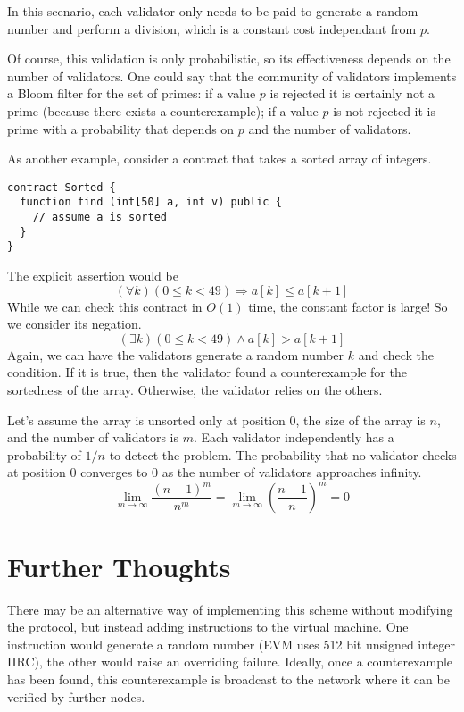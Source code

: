 \documentclass{article}
\begin{document}
In this scenario, each validator only needs to be paid to generate a random number and
perform a division, which is a constant cost independant from $p$.

Of course, this validation is only probabilistic, so its effectiveness depends on the
number of validators. One could say that the community of validators implements a Bloom
filter for the set of primes: if a value $p$ is rejected it is certainly not a prime (because
there exists a counterexample); if a value $p$ is not rejected it is prime with a
probability that depends on $p$ and the number of validators. 

As another example, consider a contract that takes a sorted array of integers.
\begin{lstlisting}[numbers=none]
contract Sorted {
  function find (int[50] a, int v) public {
    // assume a is sorted
  }
}
\end{lstlisting}
The explicit assertion would be
\begin{displaymath}
  (\forall k) (0\le k <49) \Rightarrow a[k] \le a[k+1]
\end{displaymath}
While we can check this contract in $O(1)$ time, the constant factor is large! So we
consider its negation.
\begin{displaymath}
  (\exists k) (0\le k <49) \wedge a[k] > a[k+1]
\end{displaymath}
Again, we can have the validators generate a random number $k$ and check the
condition. If it is true, then the validator found a counterexample for the sortedness
of the array. Otherwise, the validator relies on the others.

Let's assume the array is unsorted only at position $0$, the size of the array is $n$,
and the number of validators is $m$. Each validator independently has a probability of
$1/n$ to detect the problem. The probability that no validator checks at
position $0$ converges to $0$ as the number of validators approaches infinity.
\begin{displaymath}
  \lim_{m\to\infty}\frac{(n-1)^m}{n^m}
  = \lim_{m\to\infty} \left(\frac{n-1}{n}\right)^m
  = 0
\end{displaymath}

\section{Further Thoughts}
\label{sec:further-thoughts}

There may be an alternative way of implementing this scheme without modifying the
protocol, but instead adding instructions to the virtual machine. One instruction would
generate a random number (EVM uses 512 bit unsigned integer IIRC), the other would
raise an overriding failure. Ideally, once a counterexample has been found, this
counterexample is broadcast to the network where it can be verified by further nodes.
\end{document}
